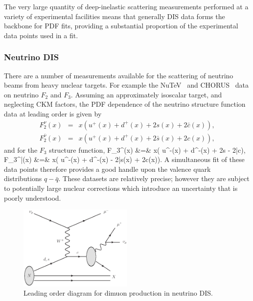 The very large quantity of deep-inelastic scattering measurements performed at a variety of experimental facilities means that generally DIS data forms the backbone for PDF fits, providing a substantial proportion of the experimental data points used in a fit.

\subsubsection{Neutrino DIS}
There are a number of measurements available for the scattering of neutrino beams from heavy nuclear targets. For example the NuTeV~\cite{Tzanov:2005kr} and CHORUS~\cite{Onengut:2005kv} data on neutrino $F_2$ and $F_3$. Assuming an approximately isoscalar target, and neglecting CKM factors, the PDF dependence of the neutrino structure function data at leading order is given by~\cite{Forte:2013wc}
\begin{eqnarray}
	F_2^\nu(x) &=& x\left( u^+(x) + d^+(x) + 2s(x) + 2\bar{c}(x)\right), \\
	F_2^{\bar{\nu}}(x) &=& x\left( u^+(x) + d^+(x) + 2\bar{s}(x) + 2c(x)\right),
\end{eqnarray}
and for the $F_3$ structure function,
\ba
	F_3^\nu(x) &=& x\left( u^-(x) + d^-(x) + 2s - 2\bar{c}\right), \\
	F_3^{\bar{\nu}}(x) &=& x\left( u^-(x) + d^-(x) - 2\bar{s}(x) + 2c(x)\right).
\ea
A simultaneous fit of these data points therefore provides a good handle upon the valence quark distributions $q-\bar{q}$. These datasets are relatively precise; however they are subject to potentially large nuclear corrections which introduce an uncertainty that is poorly understood.

\begin{figure}[ht]
\centering
\includegraphics[width=0.5\textwidth]{3-PDFdet/figs/dimuon.eps}
\caption[Leading order diagram for dimuon production in neutrino DIS]{Leading order diagram for dimuon production in neutrino DIS.}
\label{fig:dimuon}
\end{figure}

